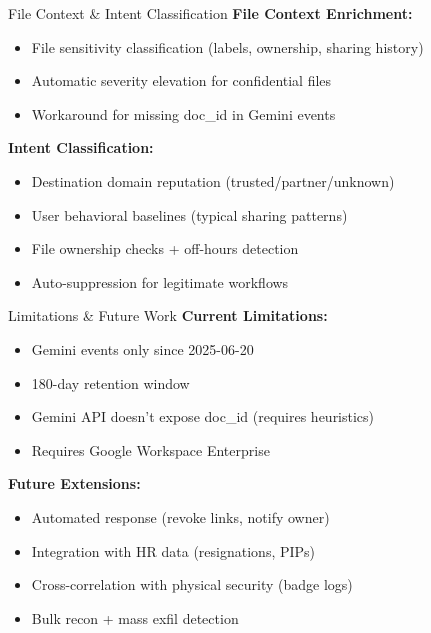 \documentclass[aspectratio=169]{beamer}
\begin{document}
\begin{frame}{File Context \& Intent Classification}
\textbf{File Context Enrichment:}
\begin{itemize}
    \item File sensitivity classification (labels, ownership, sharing history)
    \item Automatic severity elevation for confidential files
    \item Workaround for missing doc\_id in Gemini events
\end{itemize}

\vspace{1em}

\textbf{Intent Classification:}
\begin{itemize}
    \item Destination domain reputation (trusted/partner/unknown)
    \item User behavioral baselines (typical sharing patterns)
    \item File ownership checks + off-hours detection
    \item Auto-suppression for legitimate workflows
\end{itemize}
\end{frame}

\begin{frame}{Limitations \& Future Work}
\textbf{Current Limitations:}
\begin{itemize}
    \item Gemini events only since 2025-06-20
    \item 180-day retention window
    \item Gemini API doesn't expose doc\_id (requires heuristics)
    \item Requires Google Workspace Enterprise
\end{itemize}

\vspace{1em}

\textbf{Future Extensions:}
\begin{itemize}
    \item Automated response (revoke links, notify owner)
    \item Integration with HR data (resignations, PIPs)
    \item Cross-correlation with physical security (badge logs)
    \item Bulk recon + mass exfil detection
\end{itemize}
\end{frame}
\end{document}

